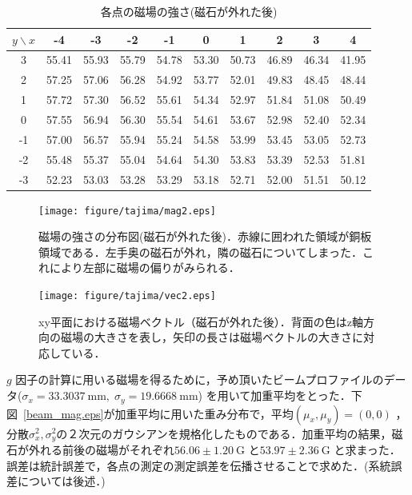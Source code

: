 \begin{table}[H]
\centering
\caption{各点の磁場の強さ(磁石が外れた後)}\label{MF2}
\begin{tabular}{|c||c|c|c|c|c|c|c|c|c|}\hline
$y \backslash x$ & -4 & -3 & -2 & -1 & 0 & 1 & 2 & 3 & 4 \\ \hline \hline
3 & 55.41 & 55.93 & 55.79 & 54.78 & 53.30 & 50.73 & 46.89 & 46.34 & 41.95 \\ \hline
2 & 57.25 & 57.06 & 56.28 & 54.92 & 53.77 & 52.01 & 49.83 & 48.45 & 48.44 \\ \hline
1 & 57.72 & 57.30 & 56.52 & 55.61 & 54.34 & 52.97 & 51.84 & 51.08 & 50.49 \\ \hline
0 & 57.55 & 56.94 & 56.30 & 55.54 & 54.61 & 53.67 & 52.98 & 52.40 & 52.34 \\ \hline
-1 & 57.00 & 56.57 & 55.94 & 55.24 & 54.58 & 53.99 & 53.45 & 53.05 & 52.73 \\ \hline
-2 & 55.48 & 55.37 & 55.04 & 54.64 & 54.30 & 53.83 & 53.39 & 52.53 & 51.81 \\ \hline
-3 & 52.23 & 53.03 & 53.28 & 53.29 & 53.18 & 52.71 & 52.00 & 51.51 & 50.12 \\ \hline
\end{tabular}
\end{table}
\begin{figure}[H]
\begin{minipage}{0.45\hsize}
\centering
\texttt{[image: figure/tajima/mag2.eps]}
\caption{磁場の強さの分布図(磁石が外れた後)．赤線に囲われた領域が銅板領域である．左手奥の磁石が外れ，隣の磁石についてしまった．これにより左部に磁場の偏りがみられる．}
\label{mag2}
\end{minipage}
\begin{minipage}{0.45\hsize}
\centering
\texttt{[image: figure/tajima/vec2.eps]}
\caption{xy平面における磁場ベクトル（磁石が外れた後）．背面の色はz軸方向の磁場の大きさを表し，矢印の長さは磁場ベクトルの大きさに対応している．}
\label{vec2}
\end{minipage}
\end{figure}

$g$ 因子の計算に用いる磁場を得るために，予め頂いたビームプロファイルのデータ($\sigma_x = 33.3037~\mathrm{mm}, \; \sigma_y = 19.6668~\mathrm{mm}$) を用いて加重平均をとった．下図~\ref{beam_mag.eps}が加重平均に用いた重み分布で，平均$(\mu_x,\mu_y)=(0,0)$ ，分散$\sigma_x^2, \sigma_y^2$の２次元のガウシアンを規格化したものである．加重平均の結果，磁石が外れる前後の磁場がそれぞれ$56.06 \pm 1.20~\mathrm{G}$ と$53.97\pm 2.36~\mathrm{G}$ と求まった．誤差は統計誤差で，各点の測定の測定誤差を伝播させることで求めた．(系統誤差については後述．)

